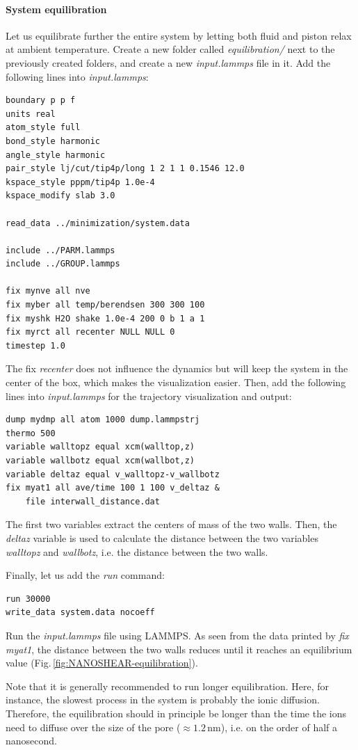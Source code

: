 \documentclass[9pt,tutorial]{livecoms}
\begin{document}
\paragraph{System equilibration}
Let us equilibrate further the entire system by letting both fluid and piston relax at ambient temperature. Create a new folder called \textit{equilibration/} next to the previously created folders, and create a new \textit{input.lammps} file in it. Add the following lines into \textit{input.lammps}:
{\normalsize \begin{verbatim}
boundary p p f
units real
atom_style full
bond_style harmonic
angle_style harmonic
pair_style lj/cut/tip4p/long 1 2 1 1 0.1546 12.0
kspace_style pppm/tip4p 1.0e-4
kspace_modify slab 3.0

read_data ../minimization/system.data

include ../PARM.lammps
include ../GROUP.lammps

fix mynve all nve
fix myber all temp/berendsen 300 300 100
fix myshk H2O shake 1.0e-4 200 0 b 1 a 1
fix myrct all recenter NULL NULL 0
timestep 1.0
\end{verbatim}}
The fix \textit{recenter} does not influence the dynamics but will keep the system in the center of the box, which makes the
visualization easier. Then, add the following lines into \textit{input.lammps} for the trajectory visualization and output:
{\normalsize \begin{verbatim}
dump mydmp all atom 1000 dump.lammpstrj
thermo 500
variable walltopz equal xcm(walltop,z)
variable wallbotz equal xcm(wallbot,z)
variable deltaz equal v_walltopz-v_wallbotz
fix myat1 all ave/time 100 1 100 v_deltaz &
    file interwall_distance.dat
\end{verbatim}}
The first two variables extract the centers of mass of the two walls. Then, the \textit{deltaz} variable is used to calculate the distance between the two variables \textit{walltopz} and \textit{wallbotz}, i.e. the distance between the two walls.

Finally, let us add the \textit{run} command: 
{\normalsize \begin{verbatim}
run 30000
write_data system.data nocoeff
\end{verbatim}}
Run the \textit{input.lammps} file using LAMMPS. As seen from the data printed by \textit{fix myat1}, the distance between the two walls reduces until it reaches an equilibrium value (Fig.\,\ref{fig:NANOSHEAR-equilibration}).

Note that it is generally recommended to run longer equilibration. Here, for instance, the slowest process in the system is probably the ionic diffusion. Therefore, the equilibration should in principle be longer than the time
the ions need to diffuse over the size of the pore ($\approx 1.2\,\text{nm}$), i.e. on the order of half a nanosecond.
\end{document}

